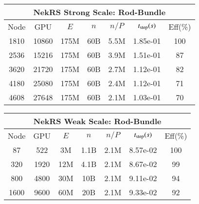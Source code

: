 
 \begin{table}[!b]
 \footnotesize
 \begin{center} \begin{tabular}{|c|c|c|c|c|c|c|}
  \hline
  \multicolumn{7}{|c|}{{\bf NekRS Strong Scale:  Rod-Bundle}}\\
  \hline
 Node & GPU   & $E$ & $n$ & $n/P$ & $t_{\rm step} (s) $ & Eff(\%)  \\
 \hline
 1810 &10860 &  175M & 60B &5.5M &1.85e-01 & 100  \\
 2536 &15216 &  175M & 60B &3.9M &1.51e-01 &  87  \\
 3620 &21720 &  175M & 60B &2.7M &1.12e-01 &  82  \\
 4180 &25080 &  175M & 60B &2.4M &1.12e-01 &  71  \\
 4608 &27648 &  175M & 60B &2.1M &1.03e-01 &  70  \\
  \hline
 \end{tabular}
 \end{center}
 \begin{center} \begin{tabular}{|c|c|c|c|c|c|c|}
  \hline
  \multicolumn{7}{|c|}{{\bf NekRS Weak Scale: Rod-Bundle}}\\
  \hline
 Node & GPU &  $E$ & $n$      &  $n/P$& $t_{\rm step}(s)$ & Eff(\%) \\
 \hline
 87   & 522   & 3M        & 1.1B  &  2.1M  & 8.57e-02  & 100   \\%
 320  & 1920  & 12M       & 4.1B  &  2.1M  & 8.67e-02  & 99    \\%
 800  & 4800  & 30M       & 10B   &  2.1M  & 9.11e-02  & 94    \\%
 1600 & 9600  & 60M       & 20B   &  2.1M  & 9.33e-02  & 92    \\%

\end{tabular}
\end{center}
\end{table}
